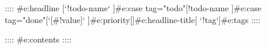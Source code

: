 \begin{e:headline}
  
\end{e:headline}


:::: {#e:headline}
[`!{todo-name}` ]{#e:case tag="todo"}[!{todo-name} ]{#e:case tag="done"}[`[#!{value}]` ]{#e:priority}[]{#e:headline-title}[ `!{tag}`]{#e:tags}
::::

:::: {#e:contents}
::::

